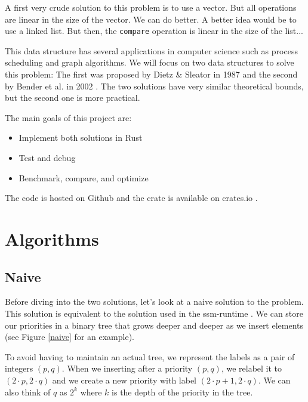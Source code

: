 \documentclass[12pt]{article}
\begin{document}
A first very crude solution to this problem is to use a vector. But all operations are linear in the size of the vector. We can do better.
A better idea would be to use a linked list. But then, the \texttt{compare} operation is linear in the size of the list...

This data structure has several applications in computer science such as process scheduling and graph algorithms.
We will focus on two data structures to solve this problem: The first was proposed by Dietz \& Sleator in 1987 \cite{10.1145/28395.28434} and the second by Bender et al. in 2002 \cite{10.5555/647912.740822}.
The two solutions have very similar theoretical bounds, but the second one is more practical.

The main goals of this project are:
\begin{itemize}
    \item Implement both solutions in Rust
    \item Test and debug
    \item Benchmark, compare, and optimize
\end{itemize}

The code is hosted on Github \cite{order-maintenance-github} and the crate is available on crates.io \cite{order-maintenance-crate}.

\newpage
\section{Algorithms}

\subsection{Naive}

Before diving into the two solutions, let's look at a naive solution to the problem.
This solution is equivalent to the solution used in the ssm-runtime \cite{9232938}.
We can store our priorities in a binary tree that grows deeper and deeper as we insert elements (see Figure \ref{naive} for an example).

To avoid having to maintain an actual tree, we represent the labels as a pair of integers $(p, q)$.
When we inserting after a priority $(p, q)$, we relabel it to $(2\cdot p, 2\cdot q)$ and we create a new priority with label $(2\cdot p + 1, 2\cdot q)$.
We can also think of $q$ as $2^k$ where $k$ is the depth of the priority in the tree.
\end{document}
